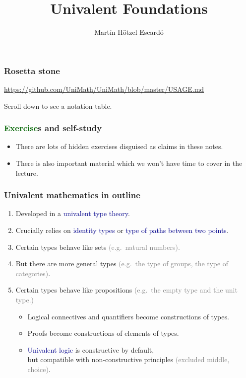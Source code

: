 \documentclass[aspectratio=169]{beamer}
\title{{\Large Univalent Foundations}}
\author{Mart\'in H\"otzel Escard\'o}
\institute{University of Birmingham, UK}
\date{\small \dg{UniMath School, Birmingham, UK, December 2017}}
\newcommand{\db}{\textcolor{darkblue}}
\newcommand{\dg}{\textcolor{darkgreen}}
\newcommand{\grey}{\textcolor{grey}}
\begin{document}
\begin{frame}
  \titlepage
\end{frame}

\begin{frame}
  \frametitle{Rosetta stone}

  \url{https://github.com/UniMath/UniMath/blob/master/USAGE.md}

  Scroll down to see a notation table.

\end{frame}

\begin{frame}
  \frametitle{\dg{Exercise}s and self-study}

  \begin{itemize}
  \vfill \item
  There are lots of hidden exercises disguised as claims in these notes.

  \vfill
  \item There is also important material which we won't have time to cover in the lecture.
  \end{itemize}

\end{frame}

\begin{frame}
  \frametitle{Univalent mathematics in outline}

  \begin{enumerate}
  \vfill \item Developed in a \db{univalent type theory}.
  \vfill \item Crucially relies on \db{identity types} or \db{type of paths between two points}.
  \vfill \item Certain types behave like sets \grey{(e.g.\ natural numbers).}
  \vfill \item But there are more general types \grey{(e.g.\ the type of groups, the type of categories)}.
  \vfill \item Certain types behave like propositions \grey{(e.g.\ the empty type and the unit type.)}
    \begin{itemize}
    \vfill \item Logical connectives and quantifiers become constructions of types.
  \vfill \item Proofs become constructions of elements of types.
  \vfill \item \db{Univalent logic} is constructive by default,
        \\ but compatible with non-constructive principles \grey{(excluded middle, choice)}.
        \end{itemize}
  \end{enumerate}

\end{frame}
\end{document}
